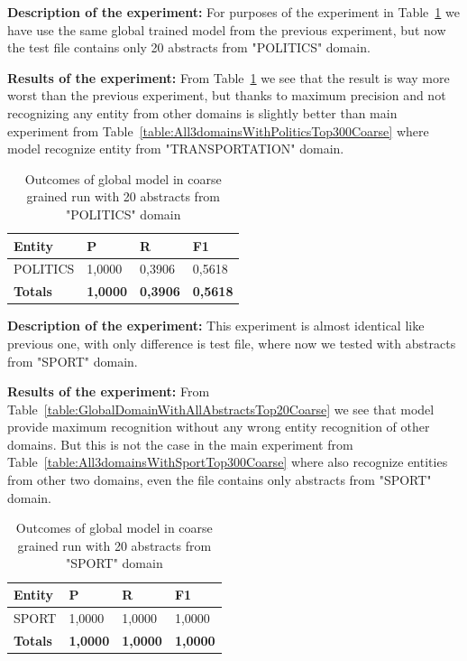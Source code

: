 \documentclass[thesis=M,english]{FITthesis}[2018/05/30]
\begin{document}
\textbf{Description of the experiment:} For purposes of the experiment in Table~\ref{table:GlobalDomainWithPoliticsTop20Coarse} we have use the same global trained model from the previous experiment, but now the test file contains only 20 abstracts from "POLITICS" domain. 

\textbf{Results of the experiment:} From Table~\ref{table:GlobalDomainWithPoliticsTop20Coarse} we see that the result is way more worst than the previous experiment, but thanks to maximum precision and not recognizing any entity from other domains is slightly better than main experiment from Table~\ref{table:All3domainsWithPoliticsTop300Coarse} where model recognize entity from "TRANSPORTATION" domain.

	\begin{table}[H]\centering
		\begin{tabular}{|l|l|l|l|}
			\hline {\textbf{Entity}} & {\textbf{P}} & {\textbf{R}} & {\textbf{F1}}\\\hline
				POLITICS & 1,0000 & 0,3906 & 0,5618\\\hline
				\textbf{Totals} & \textbf{1,0000} & \textbf{0,3906} & \textbf{0,5618}\\\hline
		\end{tabular}
		\caption{Outcomes of global model in coarse grained run with 20 abstracts from "POLITICS" domain \label{table:GlobalDomainWithPoliticsTop20Coarse}}
	\end{table}

\textbf{Description of the experiment:} This experiment is almost identical like previous one, with only difference is test file, where now we tested with abstracts from "SPORT" domain.

\textbf{Results of the experiment:} From Table~\ref{table:GlobalDomainWithAllAbstractsTop20Coarse} we see that model provide maximum recognition without any wrong entity recognition of other domains. But this is not the case in the main experiment from Table~\ref{table:All3domainsWithSportTop300Coarse} where also recognize entities from other two domains, even the file contains only abstracts from "SPORT" domain. 

	\begin{table}[H]\centering
		\begin{tabular}{|l|l|l|l|}
			\hline {\textbf{Entity}} & {\textbf{P}} & {\textbf{R}} & {\textbf{F1}}\\\hline
				SPORT & 1,0000 & 1,0000 & 1,0000\\\hline
				\textbf{Totals} & \textbf{1,0000} & \textbf{1,0000} & \textbf{1,0000}\\\hline
		\end{tabular}
		\caption{Outcomes of global model in coarse grained run with 20 abstracts from "SPORT" domain \label{table:GlobalDomainWithSportTop20Coarse}}
	\end{table}	
\end{document}
